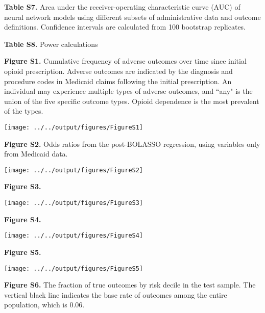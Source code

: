 \documentclass[9pt,twoside,lineno]{pnas-new}
\begin{document}
\newpage

\textbf{Table S7.} Area under the receiver-operating characteristic curve (AUC) of neural network models using different subsets of administrative data and outcome definitions. Confidence intervals are calculated from 100 bootstrap replicates.

\scriptsize

\normalsize

\newpage

\textbf{Table S8.} Power calculations



\newpage

\textbf{Figure S1.} Cumulative frequency of adverse outcomes over time since initial opioid prescription. Adverse outcomes are indicated by the diagnosis and procedure codes in Medicaid claims following the initial prescription. An individual may experience multiple types of adverse outcomes, and ``any" is the union of the five specific outcome types. Opioid dependence is the most prevalent of the types.

\texttt{[image: ../../output/figures/FigureS1]}

\newpage

\textbf{Figure S2.} Odds ratios from the post-BOLASSO regression, using variables only from Medicaid data.

\texttt{[image: ../../output/figures/FigureS2]}

\newpage

\textbf{Figure S3.}

\texttt{[image: ../../output/figures/FigureS3]}

\newpage

\textbf{Figure S4.}

\texttt{[image: ../../output/figures/FigureS4]}

\newpage

\textbf{Figure S5.}

\texttt{[image: ../../output/figures/FigureS5]}

\newpage

\textbf{Figure S6.} The fraction of true outcomes by risk decile in the test sample. The vertical black line indicates the base rate of outcomes among the entire population, which is 0.06.


\newpage


\end{document}
